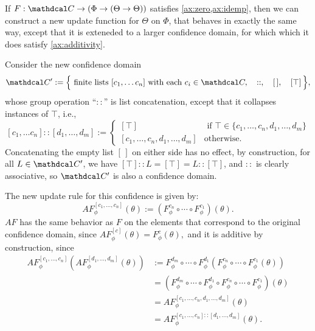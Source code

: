 \documentclass{article}
\def\confdom{\mathdcal C}
\begin{document}
\begin{prop}
    If $F: \confdom \to (\Phi \to (\Theta \to \Theta))$ satisfies \cref{ax:zero,ax:idemp}, then we can construct a new update
    function for $\Theta$ on $\Phi$, that behaves in exactly the same way, except that it is exteneded to a larger confidence domain, for which which it does satisfy \cref{ax:additivity}. 
\end{prop}
\begin{lproof}
Consider the new confidence domain
$$
    \confdom' := \Big\{ \text{ finite lists } [c_1, \ldots c_n]
        \text{ with each } c_i \in \confdom, 
        \quad
        ::,
        \quad
        [\,],
        \quad
        [\top]
        \,
    \Big\},
$$
whose group operation ``$::$'' is list concatenation, except that it collapses instances of $\top$, i.e., 
\[ 
    [c_1, \ldots c_n] :: [d_1, \ldots, d_m]
     := \begin{cases}
         [\top] & \text{ if } \top \in \{c_1, \ldots, c_n,d_1, \ldots,d_m \} \\
         [c_1, \ldots, c_{n}, d_1, \ldots, d_m] & \text{otherwise.}
 \end{cases}
\]
Concatenating the empty list $[\,]$ on either side has no effect,
by construction, for all $L \in \confdom'$, we have $[\top] :: L = [\top] = L :: [\top]$, 
and $::$ is clearly associative, so $\confdom'$ is also a confidence domain.

The new update rule for this confidence is given by:
    \[
        AF^{[c_1, \ldots, c_n]}_\phi (\theta)  :=
                (F^{c_n}_\phi \circ \cdots \circ F^{c_1}_\phi) (\theta).
    \]
$AF$ has the same behavior as $F$ on the elements that correspond to the original confidence domain, since
$
    AF^{[c]}_\phi(\theta) = F^c_\phi(\theta),
$
and it is additive by construction, since
\begin{align*}
AF^{[c_1, \ldots, c_n]}_\phi ( AF^{[d_1, \ldots, d_m]}_\phi (\theta) )
        &:=
            F^{d_m}_\phi \circ \cdots \circ F^{d_1}_\phi (
            F^{c_n}_\phi \circ \cdots \circ F^{c_1}_\phi (\theta))\\
        &= (F^{d_m}_\phi \circ \cdots \circ F^{d_1}_\phi \circ
        F^{c_n}_\phi \circ \cdots \circ F^{c_1}_\phi) (\theta) \\
        &= AF^{[c_1, \ldots, c_n, d_1, \ldots, d_m]}_\phi (\theta) \\
        &= AF^{[c_1, \ldots, c_n] :: [d_1, \ldots, d_m]}_\phi (\theta).
\end{align*}
\end{lproof}%
\end{document}
